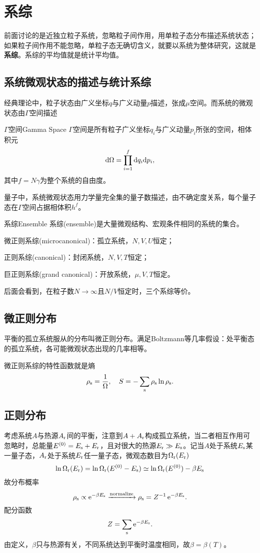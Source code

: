 \chapter{系综}
前面讨论的是近独立粒子系统，忽略粒子间作用，用单粒子态分布描述系统状态；如果粒子间作用不能忽略，单粒子态无确切含义，就要以系统为整体研究，这就是\textbf{系综}。系综的平均值就是统计平均值。
\section{系统微观状态的描述与统计系综}
经典理论中，粒子状态由广义坐标$q$与广义动量$p$描述，张成$\mu$空间。而系统的微观状态由$\varGamma$空间描述
\begin{definition}{$\varGamma$空间}{Gamma Space}
	$\varGamma$空间是所有粒子广义坐标$q_i$与广义动量$p_i$所张的空间，相体积元
	\begin{align}
		\mathop{}\!\mathrm{d}\Omega=\prod_{i=1}^f\mathop{}\!\mathrm{d} q_i\mathrm{d} p_i,
	\end{align}
	其中$f=N\gamma$为整个系统的自由度。
\end{definition}
量子中，系统微观状态用力学量完全集的量子数描述，由不确定度关系，每个量子态在$\varGamma$空间占据相体积$h^f$。
\begin{definition}{系综}{Ensemble}
	系综(ensemble)是大量微观结构、宏观条件相同的系统的集合。
	\begin{compactitem}
		\item 微正则系综(microcanonical)：孤立系统，$N,V,U$恒定；
		\item 正则系综(canonical)：\qquad\quad\enspace 封闭系统，$N,V,T$恒定；
		\item 巨正则系综(grand canonical)：开放系统，$\mu,V,T$恒定。
	\end{compactitem}
\end{definition}
后面会看到，在粒子数$N\to\infty$且$N/V$恒定时，三个系综等价。
\section{微正则分布}
平衡的孤立系统服从的分布叫微正则分布。满足Boltzmann等几率假设：处平衡态的孤立系统，各可能微观状态出现的几率相等。

微正则系综的特性函数就是熵
\[
	\rho_\mathrm s=\frac1\Omega,\quad S=-\sum_\mathrm s\rho_\mathrm s\ln\rho_\mathrm s.
\]
\section{正则分布}
考虑系统$A$与热源$A_\mathrm r$间的平衡，注意到$A+A_\mathrm r$构成孤立系统，当二者相互作用可忽略时，总能量$E^{(0)}=E_\mathrm s+E_\mathrm r$，且对很大的热源$E_\mathrm r\gg E_\mathrm s$。记当$A$处于系统$E_\mathrm s$某一量子态，$A_\mathrm r$处于系统$E_\mathrm r$任一量子态，微观态数目为$\Omega_\mathrm r(E_\mathrm r)$
\[
	\ln\Omega_\mathrm r(E_\mathrm r)=\ln\Omega_\mathrm r(E^{(0)}-E_\mathrm s)\simeq\ln\Omega_\mathrm r(E^{(0)})-\beta E_\mathrm s
\]
故分布概率
\[
	\rho_\mathrm s\propto\mathop{}\!\mathrm{e}^{-\beta E_\mathrm s}\xrightarrow{\text{normalize}}\rho_\mathrm s=Z^{-1}\mathop{}\!\mathrm{e}^{-\beta E_\mathrm s}.
\]
配分函数
\[
	Z=\sum_\mathrm s\mathop{}\!\mathrm{e}^{-\beta E_\mathrm s}.
\]
由定义，$\beta$只与热源有关，不同系统达到平衡时温度相同，故$\beta=\beta(T)$。

